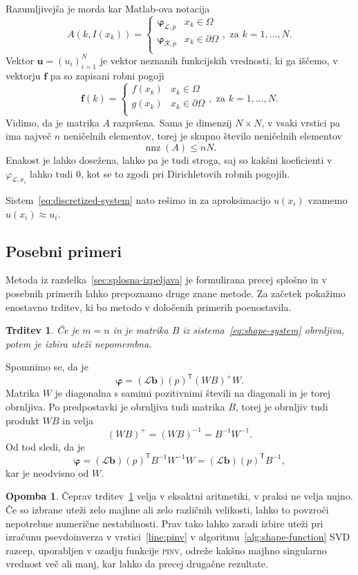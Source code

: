\documentclass[a4paper,twoside]{article}
\theoremstyle{definition} %
\newtheorem{opomba}[definicija]{Opomba}
\theoremstyle{plain} %
\newtheorem{trditev}[definicija]{Trditev}
\numberwithin{equation}{section}
\newcommand{\Rc}{\mathcal{R}}
\renewcommand{\L}{\mathcal{L}}
\newcommand{\T}{\mathsf{T}}
\renewcommand{\b}{\boldsymbol}
\renewcommand{\phi}{\varphi}
\DeclareMathOperator{\nnz}{nnz}
\begin{document}
Razumljivejša je morda kar Matlab-ova notacija
\[
A(k, I(x_k)) = \begin{cases}
    \b\phi_{\L, p} & x_k \in \Omega \\
    \b\phi_{\Rc, p} & x_k \in \partial\Omega \\
  \end{cases}, \text{ za $k = 1, \ldots, N$}.
\]
Vektor $\b{u} = (u_i)_{i=1}^N$ je vektor neznanih funkcijskih vrednosti, ki ga
iščemo, v vektorju $\b{f}$ pa so zapisani robni pogoji
\[
  \b f(k) = \begin{cases}
    f(x_k) & x_k \in \Omega \\
    g(x_k) & x_k \in \partial\Omega \\
  \end{cases}, \text{ za $k = 1, \ldots, N$}.
\]
Vidimo, da je matrika $A$ razpršena. Sama je dimenzij $N\times N$,
v vsaki vrstici pa ima največ $n$ neničelnih
elementov, torej je skupno število neničelnih elementov
\[
  \nnz(A) \leq nN.
\]
Enakost je lahko dosežena, lahko pa je tudi stroga, saj so kakšni koeficienti v $\phi_{\L,x_i}$ lahko
tudi 0, kot se to zgodi pri Dirichletovih robnih pogojih.

Sistem~\eqref{eq:discretized-system} nato rešimo in za aproksimacijo $u(x_i)$
vzamemo $u(x_i) \approx u_i$.

\subsection{Posebni primeri}
\label{sec:posebni-primeri}
Metoda iz razdelka~\ref{sec:splosna-izpeljava} je formulirana precej splošno in
v posebnih primerih lahko prepoznamo druge znane metode. Za začetek pokažimo
enostavno trditev, ki bo metodo v določenih primerih poenostavila.
\begin{trditev}
  \label{trd:weight-independence}
  Če je $m = n$ in je matrika $B$ iz sistema~\eqref{eq:shape-system} obrnljiva,
  potem je izbira uteži nepomembna.
\end{trditev}
\proof
Spomnimo se, da je \[
  \b\phi = (\L\b{b})(p)^\T(WB)^{+}W.
\]
Matrika $W$ je diagonalna s samimi pozitivnimi števili na diagonali in je torej
obrnljiva. Po predpostavki je obrnljiva tudi matrika $B$, torej je obrnljiv tudi
produkt $WB$ in velja
\[
  (WB)^+ = (WB)^{-1} = B^{-1}W^{-1}.
\]
Od tod sledi, da je
\[
  \b\phi = (\L\b{b})(p)^\T B^{-1} W^{-1} W = (\L\b{b})(p)^\T B^{-1},
\]
kar je neodvisno od $W$.
\endproof
\begin{opomba}
  Čeprav trditev~\ref{trd:weight-independence} velja v eksaktni aritmetiki, v
  praksi ne velja nujno. Če so izbrane uteži zelo majhne ali zelo različnih
  velikosti, lahko to povzroči nepotrebne numerične nestabilnosti. Prav tako
  lahko zaradi izbire uteži pri izračunu psevdoinverza v vrstici~\ref{line:pinv}
  v algoritmu~\ref{alg:shape-function} SVD razcep, uporabljen v ozadju
  funkcije \textsc{pinv}, odreže kakšno majhno singularno vrednost več ali manj,
  kar lahko da precej drugačne rezultate.
\end{opomba}
\end{document}
